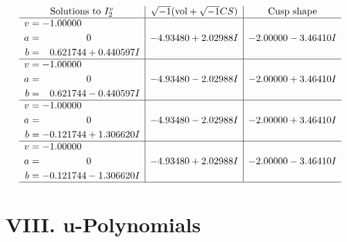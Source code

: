 \documentclass[1p]{elsarticle_modified}
\theoremstyle{definition}
\newcommand{\I}{\sqrt{-1}}
\begin{document}
$$\begin{array}{c|c|c}  
\text{Solutions to }I^v_{2}& \I (\text{vol} + \sqrt{-1}CS) & \text{Cusp shape}\\
 \hline 
\begin{aligned}
v &= -1.00000\phantom{ +0.000000I} \\
a &= \phantom{-0.000000 } 0 \\
b &= \phantom{-}0.621744 + 0.440597 I\end{aligned}
 & -4.93480 + 2.02988 I & -2.00000 - 3.46410 I \\ \hline\begin{aligned}
v &= -1.00000\phantom{ +0.000000I} \\
a &= \phantom{-0.000000 } 0 \\
b &= \phantom{-}0.621744 - 0.440597 I\end{aligned}
 & -4.93480 - 2.02988 I & -2.00000 + 3.46410 I \\ \hline\begin{aligned}
v &= -1.00000\phantom{ +0.000000I} \\
a &= \phantom{-0.000000 } 0 \\
b &= -0.121744 + 1.306620 I\end{aligned}
 & -4.93480 - 2.02988 I & -2.00000 + 3.46410 I \\ \hline\begin{aligned}
v &= -1.00000\phantom{ +0.000000I} \\
a &= \phantom{-0.000000 } 0 \\
b &= -0.121744 - 1.306620 I\end{aligned}
 & -4.93480 + 2.02988 I & -2.00000 - 3.46410 I\\
 \hline 
 \end{array}$$\newpage
\newpage\renewcommand{\arraystretch}{1}
\centering \section*{ VIII. u-Polynomials}
\end{document}
